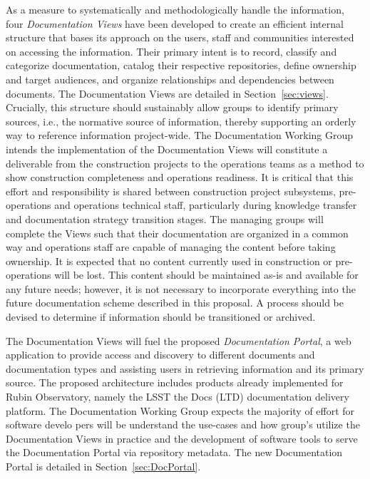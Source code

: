 As a measure to systematically and methodologically handle the information, four \emph{Documentation Views} have been developed to create an efficient internal structure that bases its approach on the users, staff and communities interested on accessing the information.
Their primary intent is to record, classify and categorize documentation, catalog their respective repositories, define ownership and target audiences, and organize relationships and dependencies between documents.
The Documentation Views are detailed in Section~\ref{sec:views}.
Crucially, this structure should sustainably allow groups to identify primary sources, i.e., the normative source of information, thereby supporting an orderly way to reference information project-wide.
The Documentation Working Group intends the implementation of the Documentation Views will constitute a deliverable from the construction projects to the operations teams as a method to show construction completeness and operations readiness.
It is critical that this effort and responsibility is shared between construction project subsystems, pre-operations and operations technical staff, particularly during knowledge transfer and documentation strategy transition stages.
The managing groups will complete the Views such that their documentation are organized in a common way and operations staff are capable of managing the content before taking ownership.
It is expected that no content currently used in construction or pre-operations will be lost.
This content should be maintained as-is and available for any future needs; however, it is not necessary to incorporate everything into the future documentation scheme described in this proposal.
A process should be devised to determine if information should be transitioned or archived.

The Documentation Views will fuel the proposed \emph{Documentation Portal}, a web application to provide access and discovery to different documents and documentation types and assisting users in retrieving information and its primary source.
The proposed architecture includes products already implemented for Rubin Observatory, namely the LSST the Docs (LTD) documentation delivery platform.
The Documentation Working Group expects the majority of effort for software develo pers will be understand the use-cases and how group's utilize the Documentation Views in practice and the development of software tools to serve the Documentation Portal via repository metadata.
The new Documentation Portal is detailed in Section~\ref{sec:DocPortal}.

